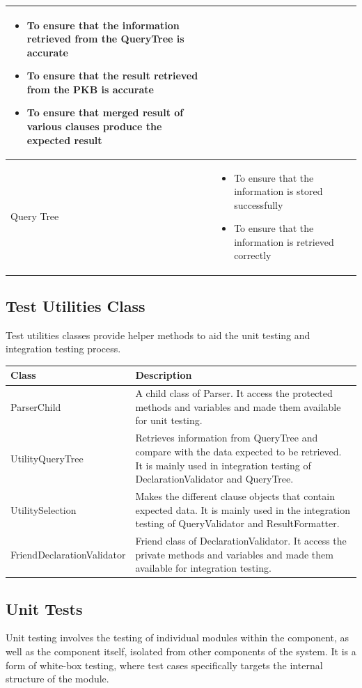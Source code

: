 \documentclass[12pt]{article}
\begin{document}
{{{{{{{{{{{{{\begin{tabular}{|L{3cm} | L{13cm}| }
\begin{itemize}[noitemsep]
\item To ensure that the information retrieved from the QueryTree is accurate
\item To ensure that the result retrieved from the PKB is accurate
\item To ensure that merged result of various clauses produce the expected result
\end{itemize}  \\\hline
 Query Tree &
\begin{itemize}[noitemsep]
\item To ensure that the information is stored successfully
\item To ensure that the information is retrieved correctly
\end{itemize}  \\\hline
\end{tabular}

\normalsize
\subsection{Test Utilities Class}
Test utilities classes provide helper methods to aid the unit testing and integration testing process.

\begin{tabular}{|L{5cm} | L{12cm}| }
\hline
\textbf{Class} &
\textbf{Description}
 \\
    \hline
    ParserChild &
A child class of Parser. It access the protected methods and variables and made them available for unit testing. \\\hline
 UtilityQueryTree &
Retrieves information from QueryTree and compare with the data expected to be retrieved. It is mainly used in integration testing of DeclarationValidator and QueryTree.  \\\hline
UtilitySelection &
Makes the different clause objects that contain expected data. It is mainly used in the integration testing of QueryValidator and ResultFormatter.  \\\hline
 FriendDeclarationValidator &
Friend class of DeclarationValidator. It access the private methods and variables and made them available for integration testing.  \\\hline
\end{tabular}


\subsection{Unit Tests}
Unit testing involves the testing of individual modules within the component, as well as the component itself, isolated from other components of the system. It is a form of white-box testing, where test cases specifically targets the internal structure of the module.

}}}}}}}}}}}}}
\end{document}
